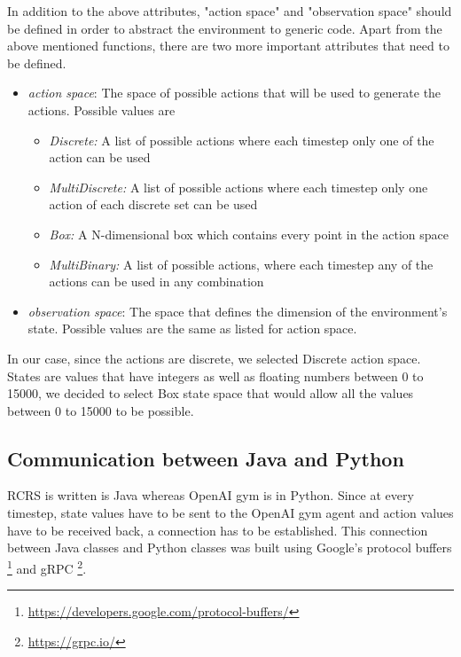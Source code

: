 \documentclass[12pt]{report}
\begin{document}
In addition to the above attributes, "action space" and "observation space" should be defined in order to abstract the environment to generic code. Apart from the above mentioned functions, there are two more important attributes that need to be defined. 

\begin{itemize}
    \item \emph{action space}: The space of possible actions that will be used to generate the actions. Possible values are 
    \begin{itemize}
        \item \emph{Discrete:} A list of possible actions where each timestep only one of the action can be used
        \item \emph{MultiDiscrete:} A list of possible actions where each timestep only one action of each discrete set can be used
        \item \emph{Box:} A N-dimensional box which contains every point in the action space
        \item \emph{MultiBinary:} A list of possible actions, where each timestep any of the actions can be used in any combination
    \end{itemize}
    
    \item \emph{observation space}: The space that defines the dimension of the environment's state. Possible values are the same as listed for action space. 
\end{itemize}

In our case, since the actions are discrete, we selected Discrete action space. States are values that have integers as well as floating numbers between 0 to 15000, we decided to select Box state space that would allow all the values between 0 to 15000 to be possible. 

\subsection{Communication between Java and Python} \label{CommunicationJavaPython}

RCRS is written is Java whereas OpenAI gym is in Python. Since at every timestep, state values have to be sent to the OpenAI gym agent and action values have to be received back, a connection has to be established. This connection between Java classes and Python classes was built using Google's protocol buffers \footnote{\url{https://developers.google.com/protocol-buffers/}}  and gRPC \footnote{\url{https://grpc.io/}}. 
\end{document}
